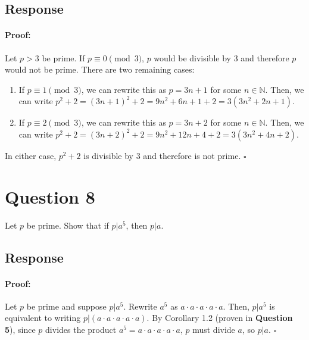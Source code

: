 \documentclass [12pt] {article}
\newcommand{\N}{\mathbb{N}}
\newenvironment{proof}{\paragraph{Proof:}}{\hfill$\square$}
\begin{document}
\subsection*{Response}
\begin{proof}
    Let $p > 3$ be prime. If $p \equiv 0 \pmod{3}$, $p$ would be divisible by $3$ and therefore 
    $p$ would not be prime. There are two remaining cases:
    \begin{enumerate}[label=\textit{Case (\roman*):},leftmargin=*]
        \item If $p \equiv 1 \pmod{3}$, we can rewrite this as $p = 3n + 1$ for some $n \in \N$.
            Then, we can write $p^2 + 2 = (3n + 1)^2 + 2 = 9n^2 + 6n + 1 + 2 = 3(3n^2 + 2n + 1)$.
        \item If $p \equiv 2 \pmod{3}$, we can rewrite this as $p = 3n + 2$ for some $n \in \N$.
            Then, we can write $p^2 + 2 = (3n + 2)^2 + 2 = 9n^2 + 12n + 4 + 2 = 3(3n^2 + 4n + 2)$.
    \end{enumerate}
    In either case, $p^2 + 2$ is divisible by $3$ and therefore is not prime.
\end{proof}

\newpage

\section*{Question 8}
Let $p$ be prime. Show that if $p|a^5$, then $p|a$. 

\subsection*{Response}
\begin{proof}
Let $p$ be prime and suppose $p | a^5$. Rewrite $a^5$ as $a \cdot a \cdot a \cdot a \cdot a$. Then, 
$p | a^5$ is equivalent to writing $p | (a \cdot a \cdot a \cdot a \cdot a)$. By 
Corollary 1.2 (proven in \textbf{Question 5}), since $p$ divides the product 
$a^5 = a \cdot a \cdot a \cdot a \cdot a$, $p$ must divide $a$, so $p | a$.
\end{proof}
\newpage
\end{document}
